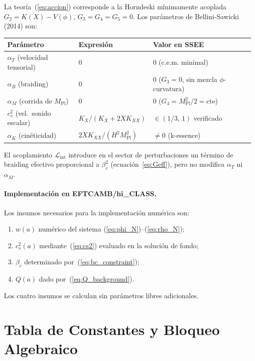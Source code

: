 \documentclass[11pt,a4paper]{article}
\newcommand{\Mpl}{M_{\mathrm{Pl}}}
\begin{document}
La teoría~(\ref{eq:accion}) corresponde a la Horndeski mínimamente acoplada
$G_2 = K(X) - V(\phi)$, $G_3 = G_4 = G_5 = 0$.  Los parámetros de
Bellini-Sawicki (2014) son:

\begin{center}
\begin{tabular}{lll}
\toprule
Parámetro & Expresión & Valor en SSEE \\
\midrule
$\alpha_T$ (velocidad tensorial) & $0$ & $0$ (c.e.m. minimal)\\
$\alpha_B$ (braiding) & $0$ & $0$ ($G_3=0$, sin mezcla $\phi$-curvatura)\\
$\alpha_M$ (corrida de $\Mpl$) & $0$ & $0$ ($G_4 = \Mpl^2/2 = \mathrm{cte}$)\\
$c_s^2$ (vel.\ sonido escalar) & $K_X/(K_X + 2X K_{XX})$ &
  $\in(1/3,\,1)$ verificado \\
$\alpha_K$ (cinéticidad) & $2X K_{XX}/(H^2\Mpl^2)$ & $\neq 0$ (k-essence) \\
\bottomrule
\end{tabular}
\end{center}

El acoplamiento $\mathcal{L}_{\mathrm{int}}$ introduce en el sector de
perturbaciones un término de braiding efectivo proporcional a $\beta_c^2$
(ecuación~\ref{eq:Geff}), pero no modifica $\alpha_T$ ni $\alpha_M$.

\paragraph{Implementación en EFTCAMB/hi\_CLASS.}
Los insumos necesarios para la implementación numérica son:
\begin{enumerate}
  \item $w(a)$ numérico del sistema (\ref{eq:phi_N})--(\ref{eq:rho_N});
  \item $c_s^2(a)$ mediante~(\ref{eq:cs2}) evaluado en la solución de fondo;
  \item $\beta_c$ determinado por~(\ref{eq:bc_constraint});
  \item $Q(a)$ dado por~(\ref{eq:Q_background}).
\end{enumerate}
Los cuatro insumos se calculan sin parámetros libres adicionales.

\section{Tabla de Constantes y Bloqueo Algebraico}
\end{document}
